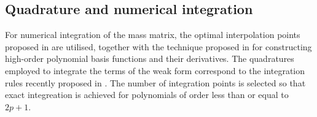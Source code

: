 

\subsection{Quadrature and numerical integration}
For numerical integration of the mass matrix, the optimal interpolation points proposed in \cite{Babuska-CB:95} are utilised, together with the technique proposed in \cite{JOCP-Hesthaven-02} for constructing high-order polynomial basis functions and their derivatives. The quadratures employed to integrate the terms of the weak form correspond to the integration rules recently proposed in \cite{Witherden20151232}. The number of integration points is selected so that exact integreation is achieved for polynomials of order less than or equal to $2p + 1$.


%  
%  


